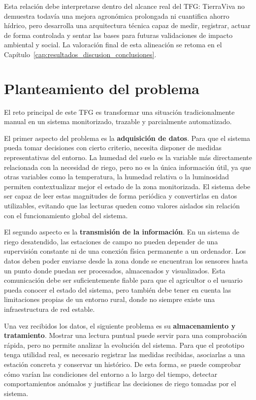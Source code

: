 Esta relación debe interpretarse dentro del alcance real del TFG: TierraViva no demuestra todavía una mejora agronómica prolongada ni cuantifica ahorro hídrico, pero desarrolla una arquitectura técnica capaz de medir, registrar, actuar de forma controlada y sentar las bases para futuras validaciones de impacto ambiental y social. La valoración final de esta alineación se retoma en el Capítulo~\ref{cap:resultados_discusion_conclusiones}.

\section{Planteamiento del problema}
\label{sec:planteamiento_problema}

El reto principal de este TFG es transformar una situación tradicionalmente manual en un sistema monitorizado, trazable y parcialmente automatizado.

El primer aspecto del problema es la \textbf{adquisición de datos}. Para que el sistema pueda tomar decisiones con cierto criterio, necesita disponer de medidas representativas del entorno. La humedad del suelo es la variable más directamente relacionada con la necesidad de riego, pero no es la única información útil, ya que otras variables como la temperatura, la humedad relativa o la luminosidad permiten contextualizar mejor el estado de la zona monitorizada. El sistema debe ser capaz de leer estas magnitudes de forma periódica y convertirlas en datos utilizables, evitando que las lecturas queden como valores aislados sin relación con el funcionamiento global del sistema.

El segundo aspecto es la \textbf{transmisión de la información}. En un sistema de riego desatendido, las estaciones de campo no pueden depender de una supervisión constante ni de una conexión física permanente a un ordenador. Los datos deben poder enviarse desde la zona donde se encuentran los sensores hasta un punto donde puedan ser procesados, almacenados y visualizados. Esta comunicación debe ser suficientemente fiable para que el agricultor o el usuario pueda conocer el estado del sistema, pero también debe tener en cuenta las limitaciones propias de un entorno rural, donde no siempre existe una infraestructura de red estable.

Una vez recibidos los datos, el siguiente problema es su \textbf{almacenamiento y tratamiento}. Mostrar una lectura puntual puede servir para una comprobación rápida, pero no permite analizar la evolución del sistema. Para que el prototipo tenga utilidad real, es necesario registrar las medidas recibidas, asociarlas a una estación concreta y conservar un histórico. De esta forma, se puede comprobar cómo varían las condiciones del entorno a lo largo del tiempo, detectar comportamientos anómalos y justificar las decisiones de riego tomadas por el sistema.

